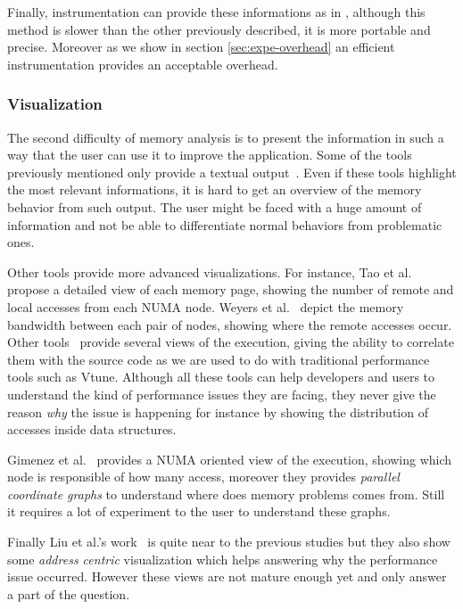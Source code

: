 Finally, instrumentation can provide these informations as in
\cite{DeRose02SIGMA}, although this method is slower than
the other previously described, it is more portable and precise. Moreover as
we show in section \ref{sec:expe-overhead} an efficient instrumentation
provides an acceptable overhead.

\subsubsection{Visualization}

The second difficulty of memory analysis is to present the information in such
a way that the user can use it to improve the application. Some of the tools
previously mentioned only provide a textual
output~\cite{Lachaize12MemProf,McCurdy2010,Martonosi92MemSpy}. Even if these
tools highlight the most relevant informations, it is hard to get an overview
of the memory behavior from such output. The user might be faced with a huge
amount of information and not be able to differentiate normal behaviors from
problematic ones.


Other tools provide more advanced visualizations. For
instance, Tao et al.~\cite{Tao01Visualizing} propose a detailed view of each memory
page, showing the number of remote and local accesses from each NUMA node. Weyers et
al.~\cite{Weyers14Visualization} depict the memory bandwidth between each pair of nodes,
showing where the remote accesses occur. Other
tools~\cite{DeRose01Hardware,DeRose02SIGMA,Bosch00Rivet} provide several views
of the execution, giving the ability to correlate them with the source code as
we are used to do with traditional performance tools such as Vtune. Although
all these tools can help developers and users to understand the kind of
performance issues they are facing, they never give the reason \emph{why} the
issue is happening for instance by showing the distribution of accesses inside data structures.

Gimenez et al.~\cite{Gimenez14Dissecting} provides a NUMA oriented view of the
execution, showing which node is responsible of how many access, moreover they
provides \emph{parallel coordinate graphs} to understand where does memory
problems comes from. Still it requires a lot of experiment to the user to
understand these graphs.

Finally Liu et al.'s work~\cite{Liu14Tool} is quite near to the previous studies but
they also show some \emph{address centric} visualization which helps answering
why the performance issue occurred. However these views are not mature enough
yet and only answer a part of the question.

